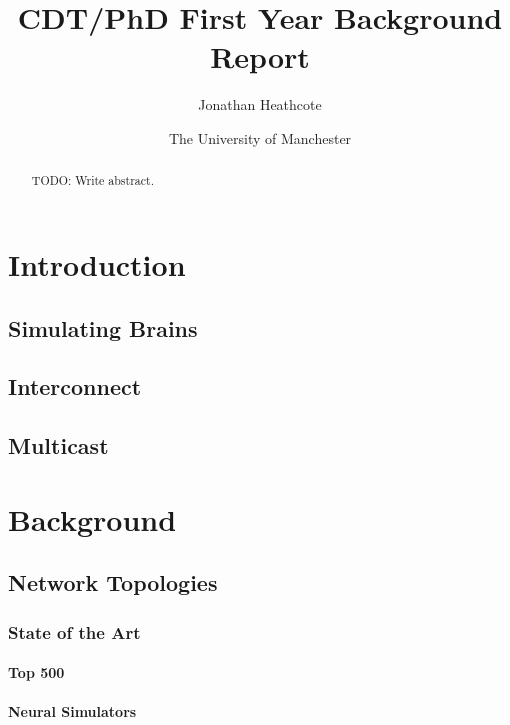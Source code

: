 \documentclass[a4paper,11pt,titlepage]{report}
\title{CDT/PhD First Year Background Report}
\author{Jonathan Heathcote}
\date{The University of Manchester}
\begin{document}
	
	\maketitle
	
	\begin{abstract}
		TODO: Write abstract.
	\end{abstract}
	
	\setcounter{tocdepth}{4}
	\tableofcontents
	
	
	
	\chapter{Introduction}
		
		\section{Simulating Brains}
		
		\section{Interconnect}
		
		\section{Multicast}
	
	
	
	\chapter{Background}
		
		\section{Network Topologies}
		
			\subsection{State of the Art}
				
				\subsubsection{Top 500}
				
				\subsubsection{Neural Simulators}
			
\end{document}
